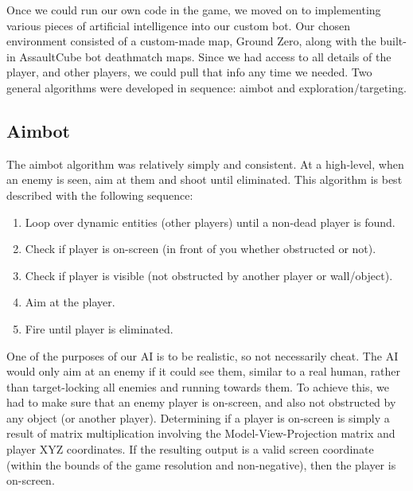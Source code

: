 \documentclass[11pt,a4paper]{article}
\begin{document}
Once we could run our own code in the game, we moved on to implementing various pieces of artificial intelligence into our custom bot. Our chosen environment consisted of a custom-made map, Ground Zero, along with the built-in AssaultCube bot deathmatch maps. Since we had access to all details of the player, and other players, we could pull that info any time we needed. Two general algorithms were developed in sequence: aimbot and exploration/targeting.

\subsection{Aimbot}
The aimbot algorithm was relatively simply and consistent. At a high-level, when an enemy is seen, aim at them and shoot until eliminated. This algorithm is best described with the following sequence: 
	\begin{enumerate}
    \item Loop over dynamic entities (other players) until a non-dead player is found. 

    \item Check if player is on-screen (in front of you whether obstructed or not).

    \item Check if player is visible (not obstructed by another player or wall/object). 

    \item Aim at the player. 

    \item Fire until player is eliminated. 
	\end{enumerate}

One of the purposes of our AI is to be realistic, so not necessarily cheat. The AI would only aim at an enemy if it could see them, similar to a real human, rather than target-locking all enemies and running towards them. To achieve this, we had to make sure that an enemy player is on-screen, and also not obstructed by any object (or another player). Determining if a player is on-screen is simply a result of matrix multiplication involving the Model-View-Projection matrix and player XYZ coordinates. If the resulting output is a valid screen coordinate (within the bounds of the game resolution and non-negative), then the player is on-screen. 
\end{document}
